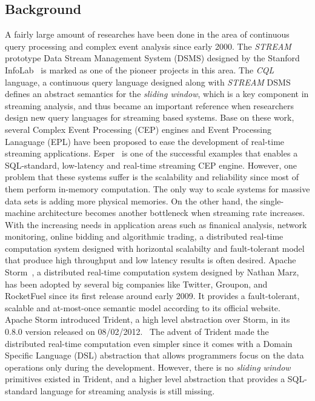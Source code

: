 \documentclass[conference, twocolumn, 11pt]{IEEEtran}
\theoremstyle{definition}
\begin{document}
\subsection{Background}
A fairly large amount of researches have been done in the area of continuous query processing and complex event analysis since early 2000. The \emph{STREAM} prototype Data Stream Management System (DSMS)
designed by the Stanford InfoLab~\cite{ABB+03} is marked as one of the pioneer projects in this area. The \emph{CQL} language, a continuous query language designed along with \emph{STREAM} DSMS defines an abstract semantics for the \emph{sliding window}, which is a key component in streaming analysis, and thus became an important reference when researchers design new query languages for streaming based systems. Base on these work, several Complex Event Processing (CEP) engines and Event Processing Lanaguage (EPL) have been proposed to ease the development of real-time streaming applications. Esper~\cite{Paul08} is one of the successful examples that enables a SQL-standard, low-latency and real-time streaming CEP engine. However, one problem that these systems suffer is the scalability and reliability since most of them perform in-memory computation. The only way to scale systems for massive data sets is adding more physical memories. On the other hand, the single-machine architecture becomes another bottleneck when streaming rate increases. With the increasing needs in application areas such as finanical analysis, network monitoring, online bidding and algorithmic trading, a distributed real-time computation system designed with horizontal scalabilty and fault-tolerant model that produce high throughput and low latency results is often desired. Apache Storm~\cite{Storm}, a distributed real-time computation system designed by Nathan Marz, has been adopted by several big companies like Twitter, Groupon, and RocketFuel since its first release around early 2009. It provides a fault-tolerant, scalable and at-most-once semantic model according to its official website. Apache Storm introduced Trident, a high level abstraction over Storm, in its 0.8.0 version released on 08/02/2012.~\cite{Trident} The advent of Trident made the distributed real-time computation even simpler since it comes with a Domain Specific Language (DSL) abstraction that allows programmers focus on the data operations only during the development. However, there is no \emph{sliding window} primitives existed in Trident, and a higher level abstraction that provides a SQL-standard language for streaming analysis is still missing.
\end{document}
